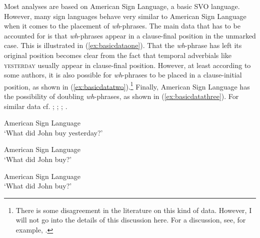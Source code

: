 \largerpage[2]
Most analyses are based on American Sign Language, a basic SVO language. However, many sign languages behave very similar to American Sign Language when it comes to the placement of \textit{wh}-phrases. The main data that has to be accounted for is that \textit{wh}-phrases appear in a clause-final position in the unmarked case. This is illustrated in (\ref{ex:basicdataone}). That the \textit{wh}-phrase has left its original position becomes clear from the fact that temporal adverbials like \textsc{yesterday} usually appear in clause-final position. However, at least according to some authors, it is also possible for \textit{wh}-phrases to be placed in a clause-initial position, as shown in (\ref{ex:basicdatatwo}).\footnote{There is some disagreement in the literature on this kind of data. However, I will not go into the details of this discussion here. For a discussion, see, for example, \citet[445--447]{sandler2006sign}.} Finally, American Sign Language has the possibility of doubling \textit{wh}-phrases, as shown in (\ref{ex:basicdatathree}). For similar data cf. \citet[26]{petronio1997}; \citet{lillo2006position}; \citet[110--115]{neidle2000syntax}; \citet[664]{pichler}.

\begin{exe}
\ex American Sign Language \\
%
\glt `What did John buy yesterday?' \label{ex:basicdataone} 
\end{exe}

\begin{exe}
\ex American Sign Language \\ 
%
\glt `What did John buy?' \label{ex:basicdatatwo} 
\end{exe}

\begin{exe}
\ex American Sign Language \\
%
\glt `What did John buy?' \label{ex:basicdatathree} 
\end{exe}

